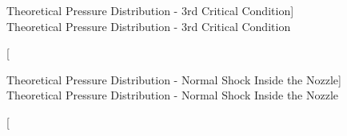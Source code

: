 \begin{figure}[htpb]
    \centering
     
     \caption
     [Theoretical Pressure Distribution - 3rd Critical Condition]
     {Theoretical Pressure Distribution - 3rd Critical Condition}
     \label{fig: TheoreticalPressureDistribution3rdCriticalCondition}
\end{figure}

\begin{figure}[htpb]
    \centering
     
     \caption
     [Theoretical Pressure Distribution - Normal Shock Inside the Nozzle]
     {Theoretical Pressure Distribution - Normal Shock Inside the Nozzle}
     \label{fig: TheoreticalPressureDistributionNormalShockInsidetheNozzle}
\end{figure}

